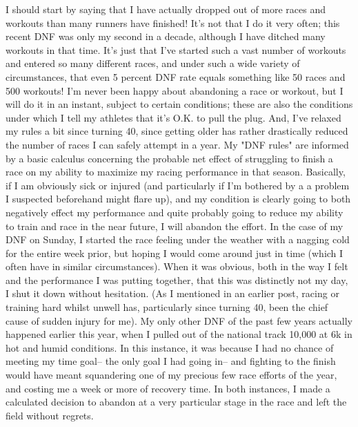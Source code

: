 I should start by saying that I have actually dropped out of more races and workouts than many runners have finished! It's not that I do it very often; this recent DNF was only my second in a decade, although I have ditched many workouts in that time. It's just that I've started such a vast number of workouts and entered so many different races, and under such a wide variety of circumstances, that even 5 percent DNF rate equals something like 50 races and 500 workouts! I'm never been happy about abandoning a race or workout, but I will do it in an instant, subject to certain conditions; these are also the conditions under which I tell my athletes that it's O.K. to pull the plug. And, I've relaxed my rules a bit since turning 40, since getting older has rather drastically reduced the number of races I can safely attempt in a year. My "DNF rules" are informed by a basic calculus concerning the probable net effect of struggling to finish a race on my ability to maximize my racing performance in that season. Basically, if I am obviously sick or injured (and particularly if I'm bothered by a a problem I suspected beforehand might flare up), and my condition is clearly going to both negatively effect my performance and quite probably going to reduce my ability to train and race in the near future, I will abandon the effort. In the case of my DNF on Sunday, I started the race feeling under the weather with a nagging cold for the entire week prior, but hoping I would come around just in time (which I often have in similar circumstances). When it was obvious, both in the way I felt and the performance I was putting together, that this was distinctly not my day, I shut it down without hesitation. (As I mentioned in an earlier post, racing or training hard whilst unwell has, particularly since turning 40, been the chief cause of sudden injury for me). My only other DNF of the past few years actually happened earlier this year, when I pulled out of the national track 10,000 at 6k in hot and humid conditions. In this instance, it was because I had no chance of meeting my time goal-- the only goal I had going in-- and fighting to the finish would have meant squandering one of my precious few race efforts of the year, and costing me a week or more of recovery time. In both instances, I made a calculated decision to abandon at a very particular stage in the race and left the field without regrets.

